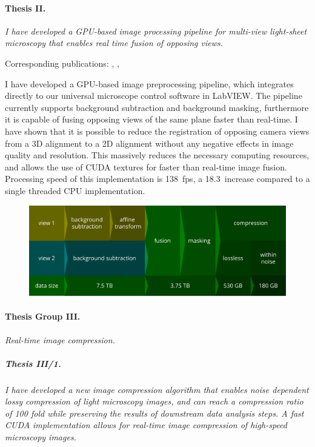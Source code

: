 \documentclass{booklet_style}
\begin{document}
  \paragraph{Thesis II.} \textit{I have developed a GPU-based image processing pipeline for multi-view light-sheet microscopy that enables real time fusion of opposing views.}

    Corresponding publications: \cite{balazs_gpu-based_2016}, \cite{balazs_gpu-based_2016-1}, \cite{balazs_gpu-based_2017}

    I have developed a GPU-based image preprocessing pipeline, which integrates directly to our universal microscope control software in LabVIEW. The pipeline currently supports background subtraction and background masking, furthermore it is capable of fusing opposing views of the same plane faster than real-time. I have shown that it is possible to reduce the registration of opposing camera views from a 3D alignment to a 2D alignment without any negative effects in image quality and resolution. This massively reduces the necessary computing resources, and allows the use of CUDA textures for faster than real-time image fusion. Processing speed of this implementation is \SI{138}{fps}, a 18.3\texttimes\ increase compared to a single threaded CPU implementation.

\clearpage
    \begin{figure}
      \centering
      \includegraphics[width=\textwidth]{4_gpu/pipeline}
      \label{fig:pipeline}
    \end{figure}
    

  \paragraph{Thesis Group III.} \textit{Real-time image compression.}
  \subparagraph{Thesis III/1.} \textit{I have  developed a new image compression algorithm that enables noise dependent lossy compression of light microscopy images, and can reach a compression ratio of 100 fold while preserving the results of downstream data analysis steps. A fast CUDA implementation allows for real-time image compression of high-speed microscopy images.}
\end{document}

